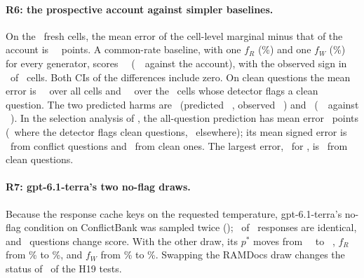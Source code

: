 \paragraph{R6: the prospective account against simpler baselines.} On the \acctN\ fresh cells, the mean error of the
cell-level marginal minus that of the account is \acctMargDiff\ \acctMargDiffCI\ points. A common-rate baseline, with one $f_R$
(\acctCommonFR\%) and one $f_W$ (\acctCommonFW\%) for every generator, scores \acctCommonMae\ \acctCommonMaeCI\
(\acctCommonDiff\ \acctCommonDiffCI\ against the account), with the observed sign in \acctCommonSign\ of \acctN\ cells. Both
CIs of the differences include zero. On clean questions the mean error is \acctCleanMaeAll\
\acctCleanMaeAllCI\ over all cells and \acctCleanMaeFlag\ \acctCleanMaeFlagCI\ over the \acctCleanNFlag\ cells whose
detector flags a clean question. The two predicted harms are \acctHarmTerraQwen\ (predicted \acctHarmTerraQwenPred\
\acctHarmTerraQwenPredCI, observed \acctHarmTerraQwenObs\ \acctHarmTerraQwenObsCI) and \acctHarmTerraMini\
(\acctHarmTerraMiniPred\ \acctHarmTerraMiniPredCI\ against \acctHarmTerraMiniObs\ \acctHarmTerraMiniObsCI). In the
selection analysis of \prs{19.1}, the all-question prediction has mean error \acctSelMae\ points (\acctSelMaeFlag\
where the detector flags clean questions, \acctSelMaeNoFlag\ elsewhere); its mean signed error is \acctSelConflict\
from conflict questions and \acctSelClean\ from clean ones. The largest error, \acctSelMaxErr\ for
\acctSelMaxErrCell, is \acctSelMaxErrClean\ from clean questions.

\paragraph{R7: gpt-6.1-terra's two no-flag draws.} Because the response cache keys on the requested temperature,
gpt-6.1-terra's no-flag condition on ConflictBank was sampled twice (\prs{20.1}); \terraDrawIdentical\ of
\terraDrawRows\ responses are identical, and \terraDrawDiffer\ questions change score. With the other draw, its $p^*$
moves from \terraDrawRegBe\ \terraDrawRegBeCI\ to \terraDrawAltBe\ \terraDrawAltBeCI, $f_R$ from \terraDrawRegFR\% to
\terraDrawAltFR\%, and $f_W$ from \terraDrawRegFW\% to \terraDrawAltFW\%. Swapping the RAMDocs draw changes the
status of \terraDrawHNineteenChanged\ of the H19 tests.

